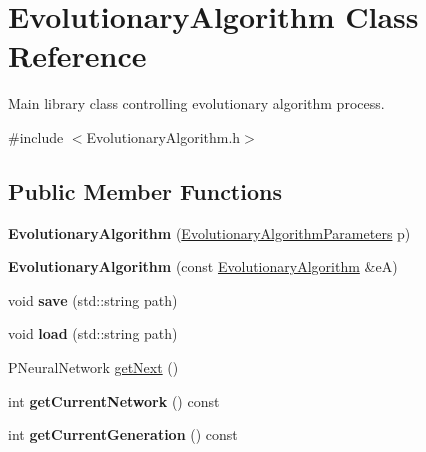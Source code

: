 \hypertarget{classEvolutionaryAlgorithm}{}\section{Evolutionary\+Algorithm Class Reference}
\label{classEvolutionaryAlgorithm}


Main library class controlling evolutionary algorithm process.  




{\ttfamily \#include $<$Evolutionary\+Algorithm.\+h$>$}

\subsection*{Public Member Functions}
\begin{DoxyCompactItemize}
\item 
{\bfseries Evolutionary\+Algorithm} (\hyperlink{structEvolutionaryAlgorithmParameters}{Evolutionary\+Algorithm\+Parameters} p)\hypertarget{classEvolutionaryAlgorithm_a5f4f99ef49165b6db8247ca1fcd1cd3d}{}\label{classEvolutionaryAlgorithm_a5f4f99ef49165b6db8247ca1fcd1cd3d}

\item 
{\bfseries Evolutionary\+Algorithm} (const \hyperlink{classEvolutionaryAlgorithm}{Evolutionary\+Algorithm} \&eA)\hypertarget{classEvolutionaryAlgorithm_a77d812bbcecd525115d2345f1828f312}{}\label{classEvolutionaryAlgorithm_a77d812bbcecd525115d2345f1828f312}

\item 
void {\bfseries save} (std\+::string path)\hypertarget{classEvolutionaryAlgorithm_a9c13bb160c25c7b2023734d22daf33ee}{}\label{classEvolutionaryAlgorithm_a9c13bb160c25c7b2023734d22daf33ee}

\item 
void {\bfseries load} (std\+::string path)\hypertarget{classEvolutionaryAlgorithm_a847aef6411699b63a823001e92305db6}{}\label{classEvolutionaryAlgorithm_a847aef6411699b63a823001e92305db6}

\item 
P\+Neural\+Network \hyperlink{classEvolutionaryAlgorithm_ad6d0bdc4039cabff7a43e90d7ed97fa6}{get\+Next} ()
\item 
int {\bfseries get\+Current\+Network} () const \hypertarget{classEvolutionaryAlgorithm_a2eef3971fd1a53f3b468ee7c309b5a46}{}\label{classEvolutionaryAlgorithm_a2eef3971fd1a53f3b468ee7c309b5a46}

\item 
int {\bfseries get\+Current\+Generation} () const \hypertarget{classEvolutionaryAlgorithm_a3f0067ea6652ad71070631bf713b40fe}{}\label{classEvolutionaryAlgorithm_a3f0067ea6652ad71070631bf713b40fe}


\end{DoxyCompactItemize}

